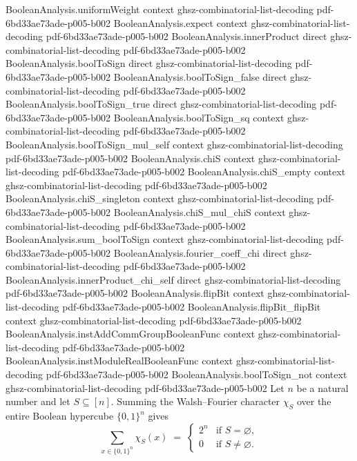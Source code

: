 \begin{lemma}
  {BooleanAnalysis.uniformWeight}
  {context}
  {ghsz-combinatorial-list-decoding}
  {pdf-6bd33ae73ade-p005-b002}
\proofstep
  {BooleanAnalysis.expect}
  {context}
  {ghsz-combinatorial-list-decoding}
  {pdf-6bd33ae73ade-p005-b002}
\proofstep
  {BooleanAnalysis.innerProduct}
  {direct}
  {ghsz-combinatorial-list-decoding}
  {pdf-6bd33ae73ade-p005-b002}
\proofstep
  {BooleanAnalysis.boolToSign}
  {direct}
  {ghsz-combinatorial-list-decoding}
  {pdf-6bd33ae73ade-p005-b002}
\proofstep
  {BooleanAnalysis.boolToSign_false}
  {direct}
  {ghsz-combinatorial-list-decoding}
  {pdf-6bd33ae73ade-p005-b002}
\proofstep
  {BooleanAnalysis.boolToSign_true}
  {direct}
  {ghsz-combinatorial-list-decoding}
  {pdf-6bd33ae73ade-p005-b002}
\proofstep
  {BooleanAnalysis.boolToSign_sq}
  {context}
  {ghsz-combinatorial-list-decoding}
  {pdf-6bd33ae73ade-p005-b002}
\proofstep
  {BooleanAnalysis.boolToSign_mul_self}
  {context}
  {ghsz-combinatorial-list-decoding}
  {pdf-6bd33ae73ade-p005-b002}
\proofstep
  {BooleanAnalysis.chiS}
  {context}
  {ghsz-combinatorial-list-decoding}
  {pdf-6bd33ae73ade-p005-b002}
\proofstep
  {BooleanAnalysis.chiS_empty}
  {context}
  {ghsz-combinatorial-list-decoding}
  {pdf-6bd33ae73ade-p005-b002}
\proofstep
  {BooleanAnalysis.chiS_singleton}
  {context}
  {ghsz-combinatorial-list-decoding}
  {pdf-6bd33ae73ade-p005-b002}
\proofstep
  {BooleanAnalysis.chiS_mul_chiS}
  {context}
  {ghsz-combinatorial-list-decoding}
  {pdf-6bd33ae73ade-p005-b002}
\proofstep
  {BooleanAnalysis.sum_boolToSign}
  {context}
  {ghsz-combinatorial-list-decoding}
  {pdf-6bd33ae73ade-p005-b002}
\proofstep
  {BooleanAnalysis.fourier_coeff_chi}
  {direct}
  {ghsz-combinatorial-list-decoding}
  {pdf-6bd33ae73ade-p005-b002}
\proofstep
  {BooleanAnalysis.innerProduct_chi_self}
  {direct}
  {ghsz-combinatorial-list-decoding}
  {pdf-6bd33ae73ade-p005-b002}
\proofstep
  {BooleanAnalysis.flipBit}
  {context}
  {ghsz-combinatorial-list-decoding}
  {pdf-6bd33ae73ade-p005-b002}
\proofstep
  {BooleanAnalysis.flipBit_flipBit}
  {context}
  {ghsz-combinatorial-list-decoding}
  {pdf-6bd33ae73ade-p005-b002}
\proofstep
  {BooleanAnalysis.instAddCommGroupBooleanFunc}
  {context}
  {ghsz-combinatorial-list-decoding}
  {pdf-6bd33ae73ade-p005-b002}
\proofstep
  {BooleanAnalysis.instModuleRealBooleanFunc}
  {context}
  {ghsz-combinatorial-list-decoding}
  {pdf-6bd33ae73ade-p005-b002}
\proofstep
  {BooleanAnalysis.boolToSign_not}
  {context}
  {ghsz-combinatorial-list-decoding}
  {pdf-6bd33ae73ade-p005-b002}
Let $n$ be a natural number and let $S \subseteq [n]$. Summing the Walsh--Fourier
character $\chi_S$ over the entire Boolean hypercube $\{0,1\}^n$ gives
\[
  \sum_{x \in \{0,1\}^n} \chi_S(x) \;=\;
\begin{cases} 2^n & \text{if } S = \varnothing,\\ 0 & \text{if } S \ne \varnothing.
\end{cases}
\]
\end{lemma}

